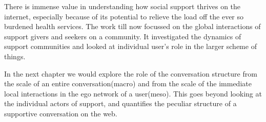 There is immense value in understanding how social support thrives on the internet, especially because of its potential to relieve the load off the ever so burdened health services. 
The work till now focussed on the global interactions of support givers and seekers on a community. It investigated the dynamics of support communities and looked at individual user's role in the larger scheme of things. 

In the next chapter we would explore the role of the conversation structure from the scale of an entire conversation(macro) and from the scale of the immediate local interactions in the ego network of a user(meso). This goes beyond looking at the individual actors of support, and quantifies the peculiar structure of a supportive conversation on the web.